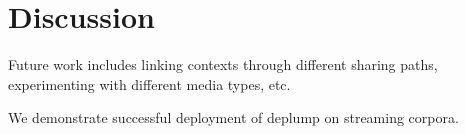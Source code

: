 \section{Discussion}
\label{sec:discussion}

Future work includes linking contexts through different sharing paths, experimenting with different media types, etc. 

We demonstrate successful deployment of deplump on streaming corpora.